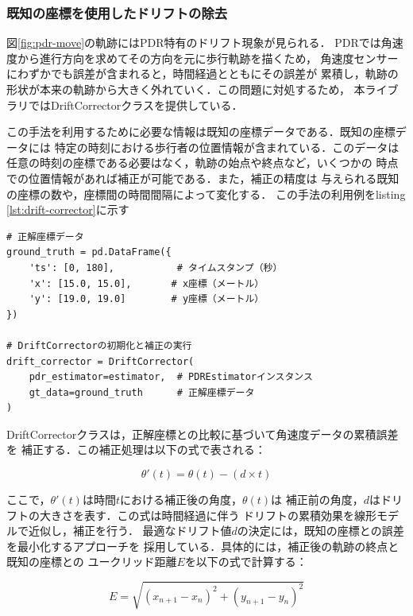 \subsubsection{既知の座標を使用したドリフトの除去}

図\ref{fig:pdr-move}の軌跡にはPDR特有のドリフト現象が見られる．
PDRでは角速度から進行方向を求めてその方向を元に歩行軌跡を描くため，
角速度センサーにわずかでも誤差が含まれると，時間経過とともにその誤差が
累積し，軌跡の形状が本来の軌跡から大きく外れていく．この問題に対処するため，
本ライブラリではDriftCorrectorクラスを提供している．

この手法を利用するために必要な情報は既知の座標データである．既知の座標データには
特定の時刻における歩行者の位置情報が含まれている．このデータは
任意の時刻の座標である必要はなく，軌跡の始点や終点など，いくつかの
時点での位置情報があれば補正が可能である．また，補正の精度は
与えられる既知の座標の数や，座標間の時間間隔によって変化する．
この手法の利用例をlisting \ref{lst:drift-corrector}に示す


\begin{lstlisting}[caption={DriftCorrector},label=lst:drift-corrector,float=h]
# 正解座標データ
ground_truth = pd.DataFrame({
    'ts': [0, 180],           # タイムスタンプ（秒）
    'x': [15.0, 15.0],       # x座標（メートル）
    'y': [19.0, 19.0]        # y座標（メートル）
})

# DriftCorrectorの初期化と補正の実行
drift_corrector = DriftCorrector(
    pdr_estimator=estimator,  # PDREstimatorインスタンス
    gt_data=ground_truth      # 正解座標データ
)
\end{lstlisting}



DriftCorrectorクラスは，正解座標との比較に基づいて角速度データの累積誤差を
補正する．この補正処理は以下の式で表される：

\begin{equation}
    \theta'(t) = \theta(t) - (d \times t)
\end{equation}

ここで，$\theta'(t)$は時間$t$における補正後の角度，$\theta(t)$は
補正前の角度，$d$はドリフトの大きさを表す．この式は時間経過に伴う
ドリフトの累積効果を線形モデルで近似し，補正を行う．
最適なドリフト値$d$の決定には，既知の座標との誤差を最小化するアプローチを
採用している．具体的には，補正後の軌跡の終点と既知の座標との
ユークリッド距離$E$を以下の式で計算する：

\begin{equation}
    E = \sqrt{(x_{n+1} - x_n)^2 + (y_{n+1} - y_n)^2}
\end{equation}

